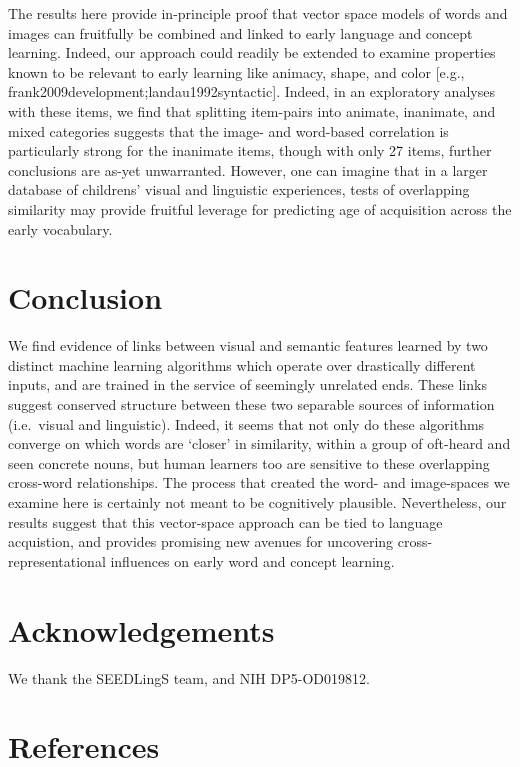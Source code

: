 \documentclass[10pt, letterpaper]{article}
\begin{document}
The results here provide in-principle proof that vector space models of
words and images can fruitfully be combined and linked to early language
and concept learning. Indeed, our approach could readily be extended to
examine properties known to be relevant to early learning like animacy,
shape, and color {[}e.g., frank2009development;landau1992syntactic{]}.
Indeed, in an exploratory analyses with these items, we find that
splitting item-pairs into animate, inanimate, and mixed categories
suggests that the image- and word-based correlation is particularly
strong for the inanimate items, though with only 27 items, further
conclusions are as-yet unwarranted. However, one can imagine that in a
larger database of childrens' visual and linguistic experiences, tests
of overlapping similarity may provide fruitful leverage for predicting
age of acquisition across the early vocabulary.

\section{Conclusion}\label{conclusion}

We find evidence of links between visual and semantic features learned
by two distinct machine learning algorithms which operate over
drastically different inputs, and are trained in the service of
seemingly unrelated ends. These links suggest conserved structure
between these two separable sources of information (i.e.~visual and
linguistic). Indeed, it seems that not only do these algorithms converge
on which words are `closer' in similarity, within a group of oft-heard
and seen concrete nouns, but human learners too are sensitive to these
overlapping cross-word relationships. The process that created the word-
and image-spaces we examine here is certainly not meant to be
cognitively plausible. Nevertheless, our results suggest that this
vector-space approach can be tied to language acquistion, and provides
promising new avenues for uncovering cross-representational influences
on early word and concept learning.

\section{Acknowledgements}\label{acknowledgements}

We thank the SEEDLingS team, and NIH DP5-OD019812.

\section{References}\label{references}
\end{document}
